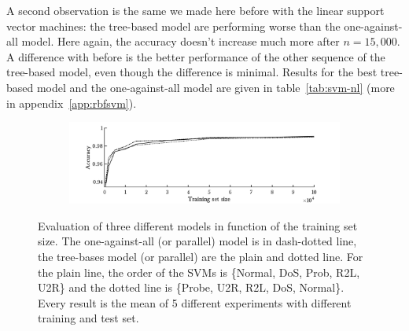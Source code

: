 A second observation is the same we made here before with the linear support vector machines: the tree-based model are performing worse than the one-against-all model. Here again, the accuracy doesn't increase much more after $n=15,000$. A difference with before is the better performance of the other sequence of the tree-based model, even though the difference is minimal. Results for the best tree-based model and the one-against-all model are given in table~\ref{tab:svm-nl} (more in appendix~\ref{app:rbfsvm}).

\begin{figure}[h!]
        \begin{subfigure}[b]{1\textwidth}  
            \centering 
            \includegraphics[width=.98\textwidth]{parts/chap-4/img-svm/svm-nl-acc.png}
        \end{subfigure}
        \caption[Comparison of RBFSVM models.]{Evaluation of three different models in function of the training set size. The one-against-all (or parallel) model is in dash-dotted line, the tree-bases model (or parallel) are the plain and dotted line. For the plain line, the order of the SVMs is \{Normal, DoS, Prob, R2L, U2R\} and the dotted line is \{Probe, U2R, R2L, DoS, Normal\}. Every result is the mean of 5 different experiments with different training and test set.}
        \label{fig:svm-nl}
\end{figure}

